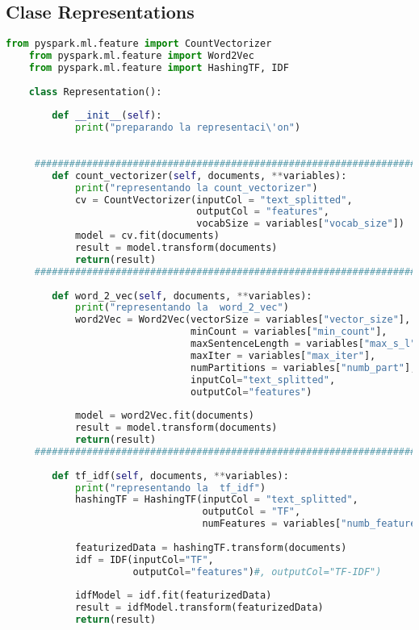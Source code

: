 \documentclass[12pt]{article}
\begin{document}
		
	\subsection{ Clase Representations}	
	\begin{lstlisting}[language=Python, caption = Clase Representations]
	from pyspark.ml.feature import CountVectorizer
	from pyspark.ml.feature import Word2Vec
	from pyspark.ml.feature import HashingTF, IDF
	
	class Representation():
	    
	    def __init__(self):
	        print("preparando la representaci\'on")
	    
	        
	 ##############################################################################
	    def count_vectorizer(self, documents, **variables):
	        print("representando la count_vectorizer")
	        cv = CountVectorizer(inputCol = "text_splitted", 
	                             outputCol = "features", 
	                             vocabSize = variables["vocab_size"])
	        model = cv.fit(documents)
	        result = model.transform(documents)
	        return(result)
	 ##############################################################################
	
	    def word_2_vec(self, documents, **variables):
	        print("representando la  word_2_vec")
	        word2Vec = Word2Vec(vectorSize = variables["vector_size"], 
	                            minCount = variables["min_count"],
	                            maxSentenceLength = variables["max_s_l"],
	                            maxIter = variables["max_iter"], 
	                            numPartitions = variables["numb_part"],
	                            inputCol="text_splitted", 
	                            outputCol="features")
	        
	        model = word2Vec.fit(documents)
	        result = model.transform(documents)
	        return(result)
	 ##############################################################################
	
	    def tf_idf(self, documents, **variables):
	        print("representando la  tf_idf")
	        hashingTF = HashingTF(inputCol = "text_splitted", 
	                              outputCol = "TF", 
	                              numFeatures = variables["numb_features"])
	        
	        featurizedData = hashingTF.transform(documents)
	        idf = IDF(inputCol="TF", 
	                  outputCol="features")#, outputCol="TF-IDF")
	        
	        idfModel = idf.fit(featurizedData)
	        result = idfModel.transform(featurizedData)
	        return(result)
	\end{lstlisting}
	
\end{document}
